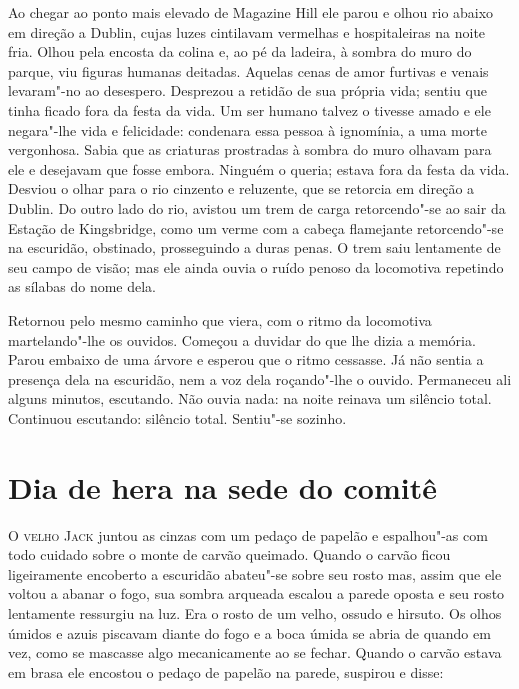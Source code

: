 Ao chegar ao ponto mais elevado de Magazine Hill ele parou e olhou rio abaixo
em direção a Dublin, cujas luzes cintilavam vermelhas e hospitaleiras na noite
fria.  Olhou pela encosta da colina e, ao pé da ladeira, à sombra do muro do
parque, viu figuras humanas deitadas.  Aquelas cenas de amor furtivas e venais
levaram"-no ao desespero.  Desprezou a retidão de sua própria vida; sentiu que
tinha ficado fora da festa da vida.  Um ser humano talvez o tivesse amado e ele
negara"-lhe vida e felicidade: condenara essa pessoa à ignomínia, a uma morte
vergonhosa.  Sabia que as criaturas prostradas à sombra do muro olhavam para
ele e desejavam que fosse embora.  Ninguém o queria; estava fora da festa da
vida.  Desviou o olhar para o rio cinzento e reluzente, que se retorcia em
direção a Dublin.  Do outro lado do rio, avistou um trem de carga retorcendo"-se
ao sair da Estação de Kingsbridge, como um verme com a cabeça flamejante
retorcendo"-se na escuridão, obstinado, prosseguindo a duras penas.  O trem saiu
lentamente de seu campo de visão; mas ele ainda ouvia o ruído penoso da
locomotiva repetindo as sílabas do nome dela.

Retornou pelo mesmo caminho que viera, com o ritmo da locomotiva martelando"-lhe
os ouvidos.  Começou a duvidar do que lhe dizia a memória.  Parou embaixo de
uma árvore e esperou que o ritmo cessasse.  Já não sentia a presença dela na
escuridão, nem a voz dela roçando"-lhe o ouvido.  Permaneceu ali alguns minutos,
escutando.  Não ouvia nada: na noite reinava um silêncio total.  Continuou
escutando: silêncio total.  Sentiu"-se sozinho.


\chapter{Dia de hera na sede do comitê}

\textsc{O velho Jack} juntou as cinzas com um pedaço de papelão e espalhou"-as
com todo cuidado sobre o monte de carvão queimado.  Quando o carvão ficou
ligeiramente encoberto a escuridão abateu"-se sobre seu rosto mas, assim que ele
voltou a abanar o fogo, sua sombra arqueada escalou a parede oposta e seu rosto
lentamente ressurgiu na luz.  Era o rosto de um velho, ossudo e hirsuto.  Os
olhos úmidos e azuis piscavam diante do fogo e a boca úmida se abria de quando
em vez, como se mascasse algo mecanicamente ao se fechar.  Quando o carvão
estava em brasa ele encostou o pedaço de papelão na parede, suspirou e disse:


